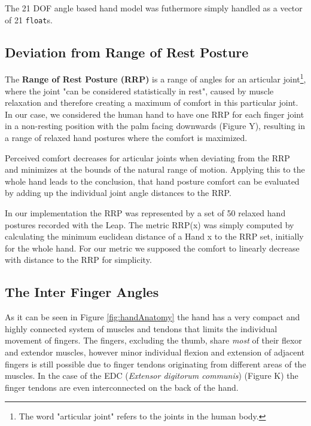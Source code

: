 \documentclass{sig-alternate-05-2015}
\begin{document}
The 21 DOF angle based hand model was futhermore simply handled as a vector of 21 \texttt{float}s. 

\subsection{Deviation from Range of Rest Posture}

The \textbf{Range of Rest Posture (RRP)} is a range of angles for an articular joint\footnote{The word "articular joint" refers to the joints in the human body.}, where the joint "can be considered statistically in rest", caused by muscle relaxation and therefore creating a maximum of comfort in this particular joint.\cite{apostolico2014postural} In our case, we considered the human hand to have one RRP for each finger joint in a non-resting position with the palm facing downwards (Figure Y), resulting in a range of relaxed hand postures where the comfort is maximized. 

Perceived comfort decreases for articular joints when deviating from the RRP and minimizes at the bounds of the natural range of motion. Applying this to the whole hand leads to the conclusion, that hand posture comfort can be evaluated by adding up the individual joint angle distances to the RRP. \cite{naddeo2015proposal}

In our implementation the RRP was represented by a set of 50 relaxed hand postures recorded with the Leap. The metric RRP(x) was simply computed by calculating the minimum euclidean distance of a Hand x to the RRP set, initially for the whole hand. 
For our metric we supposed the comfort to linearly decrease with distance to the RRP for simplicity.

\subsection{The Inter Finger Angles}

As it can be seen in Figure \ref{fig:handAnatomy}
the hand has a very compact and highly connected system of muscles and tendons that limits the individual movement of fingers.
The fingers, excluding the thumb, share \textsl{most} of their flexor and extendor muscles, however minor individual flexion and extension of adjacent fingers is still possible due to finger tendons originating from different areas of the muscles. In the case of the EDC (\textit{Extensor digitorum communis}) (Figure K) the finger tendons are even interconnected on the back of the hand. 
\end{document}
